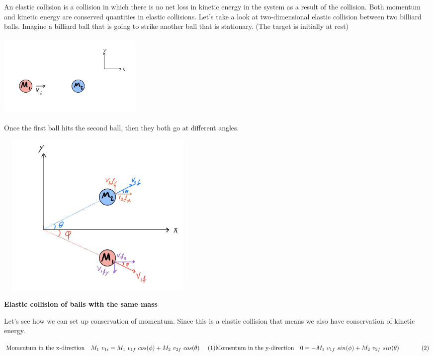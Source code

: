 \documentclass[fleqn]{article}
\begin{document}
  An elastic collision is a collision in which there is no net loss in kinetic energy in the system as a result of 
  the collision. Both momentum and kinetic energy are conserved quantities in elastic collisions. Let's take a look 
  at two-dimensional elastic collision between two billiard balls. Imagine a billiard ball that is going to strike 
  another ball that is stationary. (The target is initially at rest)
  \begin{center}
    \includegraphics[height=4cm, width=7cm]{1.JPG}
  \end{center}

  Once the first ball hits the second ball, then they both go at different angles.

  \begin{center}
    \includegraphics[height=8cm, width=10cm]{2.JPG}
  \end{center}

  \textbf{Elastic collision of balls with the same mass}

  \vspace{10px}

  Let's see how we can set up conservation of momentum. Since this is a elastic collision that means
  we also have conservation of kinetic energy.

  $
    \\
    \text{Momentum in the x-direction} ~~~ M_1 ~ v_{1i}=M_1 ~ v_{1f} ~ cos(\phi)+M_2 ~ v_{2f} ~ cos(\theta) ~~~~ (1)
    \\
    \\
    \text{Momentum in the y-direction} ~~~ 0=-M_1 ~ v_{1f} ~ sin(\phi)+M_2 ~ v_{2f} ~ sin(\theta) ~~~~~~~~~~~ (2)
  $
\end{document}
